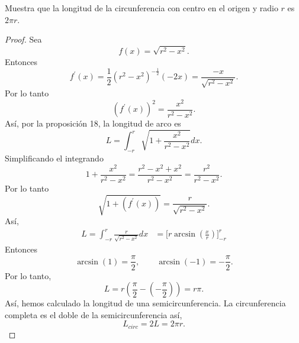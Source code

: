 \documentclass[12pt,a4paper]{article}
\begin{document}
    \begin{mdframed}[style=mdbluebox,frametitle={Ejercicio 6}]
        Muestra que la longitud de la circunferencia con centro en el origen  y radio $r$ es $2\pi r$.
    \end{mdframed}

    \begin{proof}
        Sea
        \begin{equation*}
            f(x)=\sqrt{r^{2}-x^{2}}.
        \end{equation*}
        Entonces
        \begin{equation*}
            f^{\prime}(x)=\frac{1}{2}(r^{2}-x^{2})^{-\frac12}(-2x)=\frac{-x}{\sqrt{r^{2}-x^{2}}}.
        \end{equation*}
        Por lo tanto
        \begin{equation*}
            (f^{\prime}(x))^{2}=\frac{x^{2}}{r^{2}-x^{2}}.
        \end{equation*}
        Así, por la proposición 18, la longitud de arco es
        \begin{equation*}
            L=\int_{-r}^{r}\sqrt{1+\frac{x^{2}}{r^{2}-x^{2}}}dx.
        \end{equation*}
        Simplificando el integrando
        \begin{equation*}
            1+\frac{x^{2}}{r^{2}-x^{2}}=\frac{r^{2}-x^{2}+x^{2}}{r^{2}-x^{2}}=\frac{r^{2}}{r^{2}-x^{2}}.
        \end{equation*}
        Por lo tanto
        \begin{equation*}
            \sqrt{1+(f^{\prime}(x))}=\frac{r}{\sqrt{r^{2}-x^{2}}}.
        \end{equation*}
        Así,
        \begin{align*}
            L=\int_{-r}^{r}\frac{r}{\sqrt{r^{2}-x^{2}}}dx&=\big[r\arcsin(\frac{x}{r})\big]_{-r}^{r}
        \end{align*}
        Entonces
        \begin{equation*}
            \arcsin(1)=\frac{\pi}{2},\qquad \arcsin(-1)=-\frac{\pi}{2}.
        \end{equation*}
        Por lo tanto,
        \begin{equation*}
            L=r(\frac{\pi}{2}-(-\frac{\pi}{2}))=r\pi.
        \end{equation*}
        Así, hemos calculado la longitud de una semicircunferencia. La circunferencia completa
        es el doble de la semicircunferencia así,
        \begin{equation*}
            L_{circ}=2L=2\pi r.
        \end{equation*}
    \end{proof}
\end{document}
